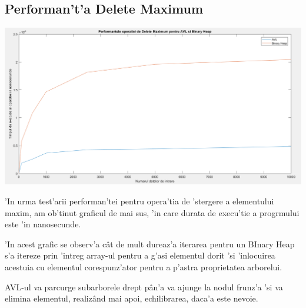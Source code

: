 \documentclass[titlepage,12pt]{article}
\numberwithin{figure}{section}
\begin{document}
\subsection{Performan't'a Delete Maximum}
\includegraphics[scale=0.5]{DM}
\\ \par 'In urma test'arii performan'tei pentru opera'tia de 'stergere a elementului maxim, am ob'tinut graficul de mai sus, 'in care durata de execu'tie a progrmului este 'in nanosecunde.
\par 'In acest grafic se observ'a c\^at de mult dureaz'a iterarea pentru un BInary Heap s'a itereze prin 'intreg array-ul pentru a g'asi elementul dorit 'si 'inlocuirea acestuia cu elementul corespunz'ator pentru a p'astra proprietatea arborelui.
\par AVL-ul va parcurge subarborele drept p\^an'a va ajunge la nodul frunz'a 'si va elimina elementul, realiz\^and mai apoi, echilibrarea, daca'a este nevoie.

\newpage
\end{document}
